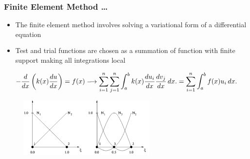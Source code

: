 \documentclass[unknownkeysallowed,12pt,mathserif]{beamer}
\begin{document}
\begin{frame}
\frametitle{Finite Element Method \ldots}

\begin{itemize}
\item The finite element method involves solving a variational form of a differential equation
\item Test and trial functions are chosen as a summation of function with finite support making all integrations local
\end{itemize}

\begin{equation}
   \footnotesize -\frac{d}{dx}\left(k(x)\frac{du}{dx}\right) = f(x) \longrightarrow \sum_{i = 1}^n\sum_{j = 1}^n \int_a^b k(x)\frac{du_i}{dx}\frac{dv_j}{dx}\,dx. = \sum_{i = 1}^n\int_a^b f(x)u_i\,dx.
\end{equation} 

\begin{figure}[!htbp] 
\includegraphics[height = 3cm]{shapes.png}
\end{figure}

\end{frame}
\end{document}
